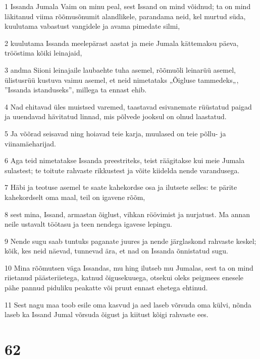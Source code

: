 \par 1 Issanda Jumala Vaim on minu peal, sest Issand on mind võidnud; ta on mind läkitanud viima rõõmusõnumit alandlikele, parandama neid, kel murtud süda, kuulutama vabastust vangidele ja avama pimedate silmi,
\par 2 kuulutama Issanda meelepärast aastat ja meie Jumala kättemaksu päeva, trööstima kõiki leinajaid,
\par 3 andma Siioni leinajaile laubaehte tuha asemel, rõõmuõli leinarüü asemel, ülistusrüü kustuva vaimu asemel, et neid nimetataks „Õigluse tammedeks„, ”Issanda istanduseks”, millega ta ennast ehib.
\par 4 Nad ehitavad üles muistsed varemed, taastavad esivanemate rüüstatud paigad ja uuendavad hävitatud linnad, mis põlvede jooksul on olnud laastatud.
\par 5 Ja võõrad seisavad ning hoiavad teie karja, muulased on teie põllu- ja viinamäeharijad.
\par 6 Aga teid nimetatakse Issanda preestriteks, teist räägitakse kui meie Jumala sulastest; te toitute rahvaste rikkustest ja võite kiidelda nende varandusega.
\par 7 Häbi ja teotuse asemel te saate kahekordse osa ja ilutsete selles: te pärite kahekordselt oma maal, teil on igavene rõõm,
\par 8 sest mina, Issand, armastan õiglust, vihkan röövimist ja nurjatust. Ma annan neile ustavalt töötasu ja teen nendega igavese lepingu.
\par 9 Nende sugu saab tuntuks paganate juures ja nende järglaskond rahvaste keskel; kõik, kes neid näevad, tunnevad ära, et nad on Issanda õnnistatud sugu.
\par 10 Mina rõõmutsen väga Issandas, mu hing ilutseb mu Jumalas, sest ta on mind riietanud päästeriietega, katnud õigusekuuega, otsekui oleks peigmees enesele pähe pannud piduliku peakatte või pruut ennast ehetega ehtinud.
\par 11 Sest nagu maa toob esile oma kasvud ja aed laseb võrsuda oma külvi, nõnda laseb ka Issand Jumal võrsuda õigust ja kiitust kõigi rahvaste ees.

\chapter{62}


